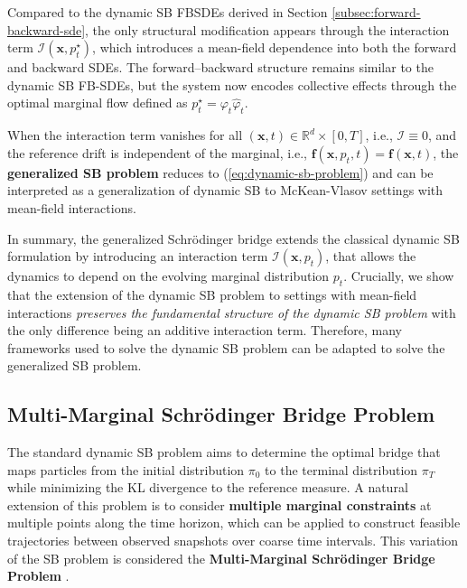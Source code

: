 \documentclass{article}
\newcommand{\boldtext}[1]{\textbf{\textcolor{MyGreen}{#1}}}
\begin{document}
Compared to the dynamic SB FBSDEs derived in Section \ref{subsec:forward-backward-sde}, the only structural modification appears through the interaction term $\mathcal{I}(\boldsymbol{x},p_t^\star)$, which introduces a mean-field dependence into both the forward and backward SDEs. The forward–backward structure remains similar to the dynamic SB FB-SDEs, but the system now encodes collective effects through the optimal marginal flow defined as $p^\star_t=\varphi_t\hat\varphi_t$.

\begin{remark}\label{remark:generalized-sb}
    When the interaction term vanishes for all $(\boldsymbol{x},t)\in \mathbb{R}^d \times[0,T]$, i.e., $\mathcal{I}\equiv 0$, and the reference drift is independent of the marginal, i.e., $\boldsymbol{f}(\boldsymbol{x},p_t,t)= \boldsymbol{f}(\boldsymbol{x},t)$, the \textbf{generalized SB problem} reduces to (\ref{eq:dynamic-sb-problem}) and can be interpreted as a generalization of dynamic SB to McKean-Vlasov settings with mean-field interactions. 
\end{remark}

In summary, the generalized Schrödinger bridge extends the classical dynamic SB formulation by introducing an interaction term $\mathcal{I}(\boldsymbol{x},p_t)$, that allows the dynamics to depend on the evolving marginal distribution $p_t$. Crucially, we show that the extension of the dynamic SB problem to settings with mean-field interactions \textit{preserves the fundamental structure of the dynamic SB problem} with the only difference being an additive interaction term. Therefore, many frameworks used to solve the dynamic SB problem can be adapted to solve the generalized SB problem.

\subsection{Multi-Marginal Schrödinger Bridge Problem}
\label{subsec:multi-marginal-sb}

The standard dynamic SB problem aims to determine the optimal bridge that maps particles from the initial distribution $\pi_0$ to the terminal distribution $\pi_T$ while minimizing the KL divergence to the reference measure. A natural extension of this problem is to consider \textbf{multiple marginal constraints} at multiple points along the time horizon, which can be applied to construct feasible trajectories between observed snapshots over coarse time intervals. This variation of the SB problem is considered the \boldtext{Multi-Marginal Schrödinger Bridge Problem} \citep{chen2019multi, chen2023deep, theodoropoulos2025momentum}.
\end{document}

